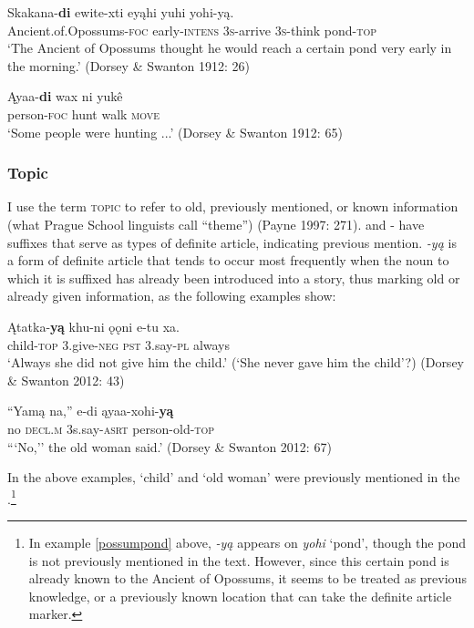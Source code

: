 \documentclass[output=paper]{LSP/langsci}
\begin{document}
\ea\label{possumpond}
\gll 	Skakana-\textbf{di} ewite-xti eyąhi yuhi yohi-y\k{a}. \\
	Ancient.of.Opossums-\textsc{foc} early-\textsc{intens} \textsc{3s}-arrive \textsc{3s}-think pond-\textsc{top}\\
\glt `The Ancient of Opossums thought he would reach a certain pond very early in the morning.' (Dorsey \& Swanton 1912: 26)
\z

\ea
\gll	Ąyaa-\textbf{di} wax ni yukê \\
	person-\textsc{foc} hunt walk \textsc{move}\\
\glt `Some people were hunting ...' (Dorsey \& Swanton 1912: 65)
\z

\subsubsection{Topic}

I use the term \textsc{topic} to refer to old, previously mentioned, or known information (what Prague School linguists call “theme”) (Payne 1997: 271).  and - have suffixes that serve as types of definite article, indicating previous mention.  \emph{-yą} is a form of definite article that tends to occur most frequently when the noun to which it is suffixed has already been introduced into a story, thus marking old or already given information, as the following examples show: 

\ea
\gll	Ątatka-\textbf{yą } khu-ni 	 ǫǫni e-tu 	 xa.\\ 
child-\textsc{top} 3.give-\textsc{neg} \textsc{pst} 	 3.say-\textsc{pl} always \\
\glt `Always she did not give him the child.' (`She never gave him the child'?) (Dorsey \& Swanton 2012: 43)
\z

\ea
\gll	“Yamą na,” 	 e-di 	 ąyaa-xohi-\textbf{yą}\\
	\hspace{.6em}no 	\textsc{decl.m} 3s.say-\textsc{asrt} person-old-\textsc{top} \\
\glt ```No,'' the old woman said.' (Dorsey \& Swanton 2012: 67)
\z

In the above examples, `child' and `old woman' were previously mentioned in the .\footnote{In example \ref{possumpond} above, \emph{-yą} appears on \emph{yohi} `pond', though the pond is not previously mentioned in the text. However, since this certain pond is already known to the Ancient of Opossums, it seems to be treated as previous knowledge, or a previously known location that can take the definite article marker.}
\end{document}
